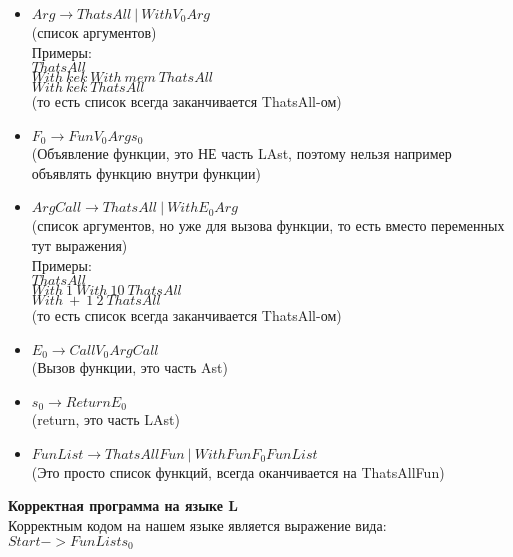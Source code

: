 \documentclass[12pt]{article}
\begin{document}
\begin{itemize}
	\item $Arg \to ThatsAll \ | \ With $\textvisiblespace$ V_0 $\textvisiblespace$ Arg$ \\ (список аргументов) \\
	Примеры: \\ 
	$ThatsAll$ \\
	$With \ kek \ With \ mem \ ThatsAll$ \\
	$With \ kek \ ThatsAll$ \\
	(то есть список всегда заканчивается ThatsAll-ом)
	
	\item $F_0 \to Fun $\textvisiblespace$  V_0 $\textvisiblespace$ Arg $\textvisiblespace$ s_0$ \\
	(Объявление функции, это НЕ часть LAst, поэтому нельзя например объявлять функцию внутри функции) \\



	\item $ArgCall \to ThatsAll \ | \ With $\textvisiblespace$ E_0 $\textvisiblespace$ Arg$ \\ (список аргументов, но уже для вызова функции, то есть вместо переменных тут выражения) \\
	Примеры: \\ 
	$ThatsAll$ \\
	$With \ 1 \ With \ 10 \ ThatsAll$ \\
	$With \ + \ 1 \ 2 \ ThatsAll$ \\
	(то есть список всегда заканчивается ThatsAll-ом)
	
	\item $E_0 \to Call $\textvisiblespace$  V_0 $\textvisiblespace$ ArgCall$ \\
	(Вызов функции, это часть Ast) \\
	
	
	
	\item $s_0 \to Return $\textvisiblespace$ E_0 $ \\
	(return, это часть LAst) \\
	
	
	\item $FunList \to ThatsAllFun \ | \ WithFun $\textvisiblespace$ F_0 $\textvisiblespace$ FunList$ \\
	(Это просто список функций, всегда оканчивается на ThatsAllFun) \\
		
\end{itemize}

\textbf{Корректная программа на языке L} \\
Корректным кодом на нашем языке является выражение вида: \\
$Start -> FunList  $\textvisiblespace$ s_0$
\end{document}
